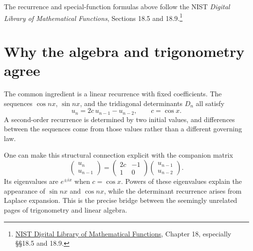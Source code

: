 The recurrence and special-function formulas above follow the NIST \emph{Digital Library of Mathematical Functions}, Sections 18.5 and 18.9.\footnote{\href{https://dlmf.nist.gov/18}{NIST Digital Library of Mathematical Functions}, Chapter 18, especially \S\S18.5 and 18.9.}

\section{Why the algebra and trigonometry agree}

The common ingredient is a linear recurrence with fixed coefficients. The sequences \(\cos nx\), \(\sin nx\), and the tridiagonal determinants \(D_n\) all satisfy
\[
 u_n=2c\,u_{n-1}-u_{n-2},\qquad c=\cos x.
\]
A second-order recurrence is determined by two initial values, and differences between the sequences come from those values rather than a different governing law.

One can make this structural connection explicit with the companion matrix
\[
 \begin{pmatrix}u_n\\u_{n-1}\end{pmatrix}
 =
 \begin{pmatrix}2c&-1\\1&0\end{pmatrix}
 \begin{pmatrix}u_{n-1}\\u_{n-2}\end{pmatrix}.
\]
Its eigenvalues are \(e^{\pm ix}\) when \(c=\cos x\). Powers of these eigenvalues explain the appearance of \(\sin nx\) and \(\cos nx\), while the determinant recurrence arises from Laplace expansion. This is the precise bridge between the seemingly unrelated pages of trigonometry and linear algebra.
